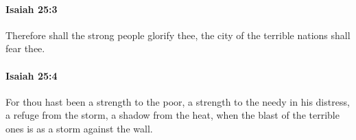 		\paragraph{Isaiah 25:3} %
			\label{ISAIAH-25-3}

			Therefore shall the strong people glorify thee, the city of the terrible nations shall fear thee.


		\paragraph{Isaiah 25:4} %
			\label{ISAIAH-25-4}

			For thou hast been a strength to the poor, a strength to the needy in his distress, a refuge from the storm, a shadow from the heat, when the blast of the terrible ones is as a storm against the wall.


